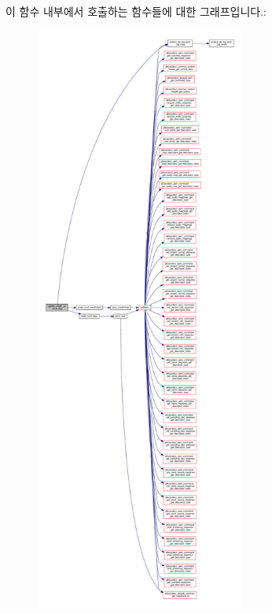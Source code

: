 이 함수 내부에서 호출하는 함수들에 대한 그래프입니다.\+:
\nopagebreak
\begin{figure}[H]
\begin{center}
\leavevmode
\includegraphics[height=550pt]{classavdecc__lib_1_1aecp__controller__state__machine_a997abd9786c330a5505e903e6443208e_cgraph}
\end{center}
\end{figure}




